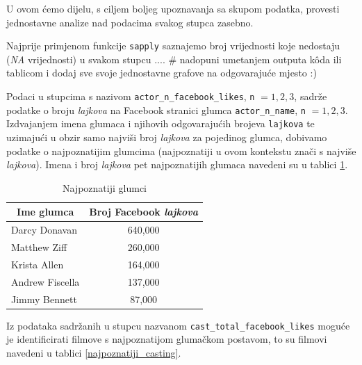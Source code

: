 	 U ovom ćemo dijelu, s ciljem boljeg upoznavanja sa skupom podatka, provesti jednostavne analize nad podacima svakog stupca zasebno. 
	 
	 Najprije primjenom funkcije \texttt{sapply} saznajemo broj vrijednosti koje nedostaju (\textit{NA} vrijednosti) u svakom stupcu .... \# nadopuni umetanjem outputa kôda ili tablicom i dodaj sve svoje jednostavne grafove na odgovarajuće mjesto :)
	 
	 Podaci u stupcima s nazivom \texttt{actor\_n\_facebook\_likes}, \texttt{n} $= 1, 2, 3$,  sadrže podatke o broju \textit{lajkova} na Facebook stranici glumca \texttt{actor\_n\_name}, \texttt{n} $= 1, 2, 3$. Izdvajanjem imena glumaca i njihovih odgovarajućih brojeva \texttt{lajkova} te uzimajući u obzir samo najviši broj \textit{lajkova} za pojedinog glumca, dobivamo podatke o najpoznatijim glumcima (najpoznatiji u ovom kontekstu znači s najviše \textit{lajkova}). Imena i broj \textit{lajkova} pet najpoznatijih glumaca navedeni su u tablici \ref{najpoznatiji_glumci}. 
	 
	 
	 \begin{table}[h]
	 	\centering
	 	\renewcommand{\arraystretch}{1.5} %
	 	\begin{tabular}{|l|c|}
	 		\hline
	 		\multicolumn{1}{|c|}{\textbf{Ime glumca}} & \multicolumn{1}{c|}{\textbf{Broj Facebook \textit{lajkova}}} \\
	 		\hline
	 		Darcy Donavan & 640,000 \\
	 		\hline
	 		Matthew Ziff & 260,000 \\
	 		\hline			
	 		Krista Allen & 164,000 \\
	 		\hline		
	 		Andrew Fiscella & 137,000 \\
	 		\hline		
	 		Jimmy Bennett & 87,000 \\
	 		\hline
	 	\end{tabular}
	 	\caption{Najpoznatiji glumci}
	 	\label{najpoznatiji_glumci}
	 \end{table}
	 
	 
	 Iz podataka sadržanih u stupcu nazvanom \texttt{cast\_total\_facebook\_likes} moguće je  identificirati filmove s najpoznatijom glumačkom postavom, to su filmovi navedeni u tablici \ref{najpoznatiji_casting}.
	 
